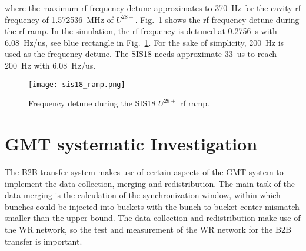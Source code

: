 where the maximum rf frequency detune approximates to \SI{370}{Hz} for the cavity rf frequency of \SI{1.572536}{MHz} of $U^{ 28+}$. Fig.~\ref{sis18_ramp} shows the rf frequency detune during the rf ramp. In the simulation, the rf frequency is detuned at \SI{0.2756}{s} with \SI{6.08}{Hz/us}, see blue rectangle in Fig.~\ref{sis18_ramp}. For the sake of simplicity, \SI{200}{Hz} is used as the frequency detune. The SIS18 needs approximate \SI{33}{us} to reach \SI{200}{Hz} with \SI{6.08}{Hz/us}.
\begin{figure}[!htb]
   \centering   
   \texttt{[image: sis18\_ramp.png]}
   \caption{Frequency detune during the SIS18 $U^{28+}$ rf ramp.}
   \label{sis18_ramp}
\end{figure}


\section{GMT systematic Investigation}
The B2B transfer system makes use of certain aspects of the GMT system to implement the data collection, merging and redistribution. The main task of the data merging is the calculation of the synchronization window, within which bunches could be injected into buckets with the bunch-to-bucket center mismatch smaller than the upper bound. The data collection and redistribution make use of the WR network, so the test and measurement of the WR network for the B2B transfer is important. 

